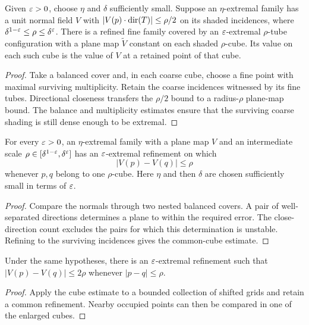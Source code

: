 \begin{lemma}
\label{lem:coarse-plane-map}
Given $\varepsilon>0$, choose $\eta$ and $\delta$ sufficiently small. Suppose
an $\eta$-extremal family has a unit normal field $V$ with
$|V(p)\cdot\operatorname{dir}(T)|\leq\rho/2$ on its shaded incidences, where
$\delta^{1-\varepsilon}\leq\rho\leq\delta^\varepsilon$.
There is a refined fine family covered by an $\varepsilon$-extremal
$\rho$-tube configuration with a plane map $\widetilde V$ constant
on each shaded $\rho$-cube. Its value on each such cube is the value
of $V$ at a retained point of that cube.
\end{lemma}
\begin{proof}
Take a balanced cover and, in each coarse cube, choose a fine point
with maximal surviving multiplicity. Retain the coarse incidences
witnessed by its fine tubes. Directional closeness transfers the
$\rho/2$ bound to a radius-$\rho$ plane-map bound. The balance and
multiplicity estimates ensure that the surviving coarse shading is
still dense enough to be extremal.
\end{proof}

\begin{lemma}
\label{lem:plane-oscillation}
For every $\varepsilon>0$, an $\eta$-extremal family with a plane map $V$
and an intermediate scale
$\rho\in[\delta^{1-\varepsilon},\delta^\varepsilon]$ has an $\varepsilon$-extremal
refinement on which
\[
        |V(p)-V(q)|\leq\rho
\]
whenever $p,q$ belong to one $\rho$-cube. Here $\eta$ and then
$\delta$ are chosen sufficiently small in terms of $\varepsilon$.
\end{lemma}
\begin{proof}
Compare the normals through two nested balanced covers. A pair of
well-separated directions determines a plane to within the required
error. The close-direction count excludes the pairs for which this
determination is unstable. Refining to the surviving incidences gives
the common-cube estimate.
\end{proof}

\begin{corollary}
\label{cor:plane-oscillation}
Under the same hypotheses, there is an $\varepsilon$-extremal refinement
such that $|V(p)-V(q)|\leq2\rho$ whenever $|p-q|\leq\rho$.
\end{corollary}
\begin{proof}
Apply the cube estimate to a bounded collection of shifted grids and
retain a common refinement. Nearby occupied points can then be
compared in one of the enlarged cubes.
\end{proof}

